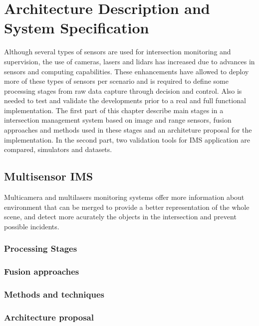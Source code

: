 
\chapter {Architecture Description and System Specification}

Although several types of sensors are used for intersection monitoring and supervision, the use of cameras, lasers and lidars has increased due to advances in sensors and computing capabilities. These enhancements have allowed to deploy more of these types of sensors per scenario and is required to define some processing stages from raw data capture through decision and control. Also is needed to test and validate the developments prior to a real and full functional implementation. The first part of this chapter describe main stages in a intersection management system based on image and range sensors, fusion approaches and methods used in these stages and an architeture proposal for the implementation. In the second part, two validation tools for IMS application are compared, simulators and datasets.

\section{Multisensor IMS}
Multicamera and multilasers monitoring systems offer more information about environment that can be merged to provide a better representation of the whole scene, and detect more acurately the objects in the intersection and prevent possible incidents.
\subsection{Processing Stages}
\subsection{Fusion approaches}
\subsection{Methods and techniques}
\subsection{Architecture proposal}
